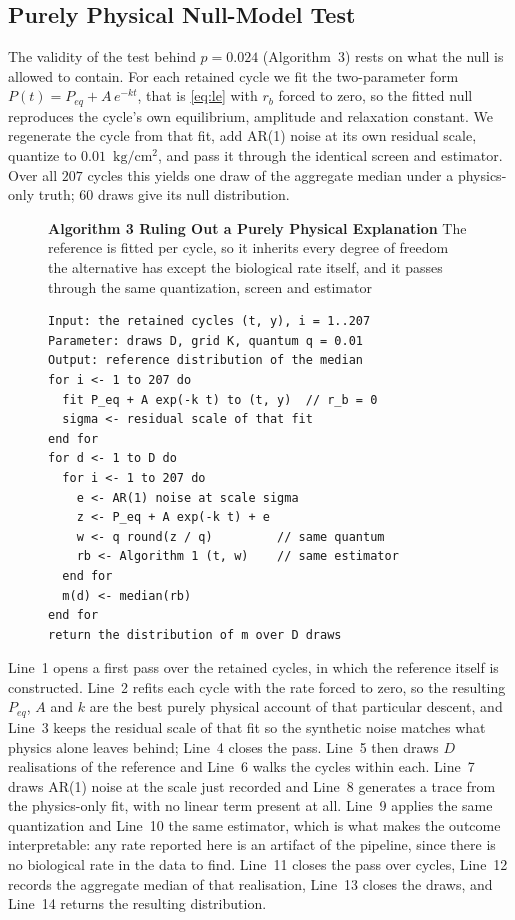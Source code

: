 \documentclass[runningheads]{llncs}
\newcommand{\pu}{\ensuremath{\mathrm{kg/cm^{2}}}}
\newcommand{\rb}{\ensuremath{r_{b}}}
\begin{document}
\subsection{Purely Physical Null-Model Test}
\label{sec:null}

The validity of the test behind $p=0.024$ (Algorithm~3) rests on what the null is
allowed to contain. For each retained cycle we fit the two-parameter
form $P(t)=P_{eq}+A\,e^{-kt}$, that is \eqref{eq:le} with $\rb$ forced
to zero, so the fitted null reproduces the cycle's own equilibrium,
amplitude and relaxation constant. We regenerate the cycle from that
fit, add AR(1) noise at its own residual scale, quantize to
$0.01$~\pu{}, and pass it through the identical screen and estimator.
Over all $207$ cycles this yields one draw of the aggregate median
under a physics-only truth; $60$ draws give its null distribution.

\begin{figure}[t]
\noindent\textbf{Algorithm 3  Ruling Out a Purely Physical Explanation}
The reference is fitted per cycle, so it inherits every degree of
freedom the alternative has except the biological rate itself, and it
passes through the same quantization, screen and estimator

\begin{verbatim}
Input: the retained cycles (t, y), i = 1..207
Parameter: draws D, grid K, quantum q = 0.01
Output: reference distribution of the median
for i <- 1 to 207 do
  fit P_eq + A exp(-k t) to (t, y)  // r_b = 0
  sigma <- residual scale of that fit
end for
for d <- 1 to D do
  for i <- 1 to 207 do
    e <- AR(1) noise at scale sigma
    z <- P_eq + A exp(-k t) + e
    w <- q round(z / q)         // same quantum
    rb <- Algorithm 1 (t, w)    // same estimator
  end for
  m(d) <- median(rb)
end for
return the distribution of m over D draws
\end{verbatim}

\end{figure}

Line~1 opens a first pass over the retained cycles, in which the
reference itself is constructed. Line~2 refits each cycle with the rate
forced to zero, so the resulting $P_{eq}$, $A$ and $k$ are the best
purely physical account of that particular descent, and Line~3 keeps
the residual scale of that fit so the synthetic noise matches what
physics alone leaves behind; Line~4 closes the pass. Line~5 then
draws $D$ realisations of the reference and Line~6 walks the cycles
within each. Line~7 draws AR(1) noise at the scale just recorded and
Line~8 generates a trace from the physics-only fit, with no linear
term present at all. Line~9 applies the same quantization and
Line~10 the same estimator, which is what makes the outcome
interpretable: any rate reported here is an artifact of the pipeline,
since there is no biological rate in the data to find. Line~11 closes
the pass over cycles, Line~12 records the aggregate median of that
realisation, Line~13 closes the draws, and Line~14 returns the
resulting distribution.
\end{document}
